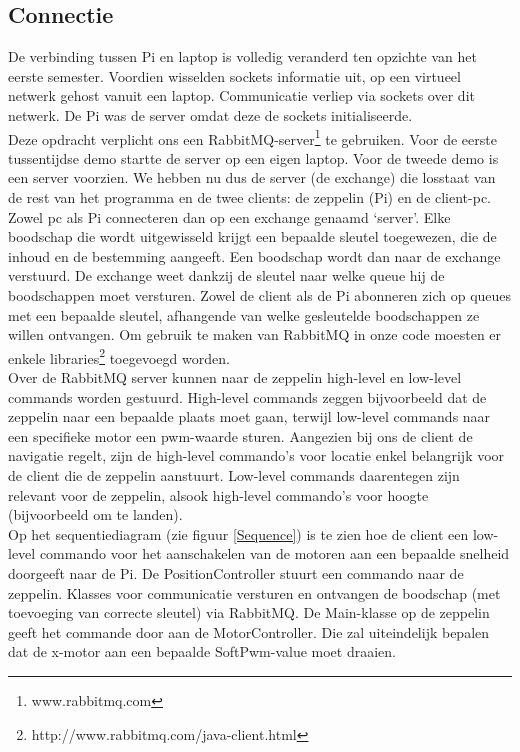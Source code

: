 \documentclass[eind]{penoverslag}
\begin{document}
\subsection{Connectie}
De verbinding tussen Pi en laptop is volledig veranderd ten opzichte van het eerste semester. Voordien wisselden sockets informatie uit, op een virtueel netwerk gehost vanuit een laptop. Communicatie verliep via sockets over dit netwerk. De Pi was de server omdat deze de sockets initialiseerde.\\
Deze opdracht verplicht ons een RabbitMQ-server\footnote{www.rabbitmq.com} te gebruiken. Voor de eerste tussentijdse demo startte de server op een eigen laptop. Voor de tweede demo is een server voorzien. We hebben nu dus de server (de exchange) die losstaat van de rest van het programma en de twee clients: de zeppelin (Pi) en de client-pc. Zowel pc als Pi connecteren dan op een exchange genaamd ‘server’. Elke boodschap die wordt uitgewisseld krijgt een bepaalde sleutel toegewezen, die de inhoud en de bestemming aangeeft. Een boodschap wordt dan naar de exchange verstuurd. De exchange weet dankzij de sleutel naar welke queue hij de boodschappen moet versturen. Zowel de client als de Pi abonneren zich op queues met een bepaalde sleutel, afhangende van welke gesleutelde boodschappen ze willen ontvangen. Om gebruik te maken van RabbitMQ in onze code moesten er enkele libraries\footnote{http://www.rabbitmq.com/java-client.html} toegevoegd worden. \\

Over de RabbitMQ server kunnen naar de zeppelin high-level en low-level commands worden gestuurd. High-level commands zeggen bijvoorbeeld dat de zeppelin naar een bepaalde plaats moet gaan, terwijl low-level commands naar een specifieke motor een pwm-waarde sturen. Aangezien bij ons de client de navigatie regelt, zijn de high-level commando's voor locatie enkel belangrijk voor de client die de zeppelin aanstuurt. Low-level commands daarentegen zijn relevant voor de zeppelin, alsook high-level commando's voor hoogte (bijvoorbeeld om te landen). \\


Op het sequentiediagram (zie figuur \ref{Sequence}) is te zien hoe de client een low-level commando voor het aanschakelen van de motoren aan een bepaalde snelheid doorgeeft naar de Pi. De PositionController stuurt een commando naar de zeppelin. Klasses voor communicatie versturen en ontvangen de boodschap (met toevoeging van correcte sleutel) via RabbitMQ. De Main-klasse op de zeppelin geeft het commande door aan de MotorController. Die zal uiteindelijk bepalen dat de x-motor aan een bepaalde SoftPwm-value moet draaien.
\\
\end{document}
